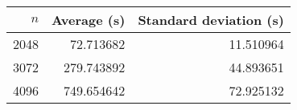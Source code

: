 \begin{tabular}{rrr}
$n$ & Average (s) & Standard deviation (s)\\\hline
2048 & 72.713682 & 11.510964\\
3072 & 279.743892 & 44.893651\\
4096 & 749.654642 & 72.925132\\
\end{tabular}
